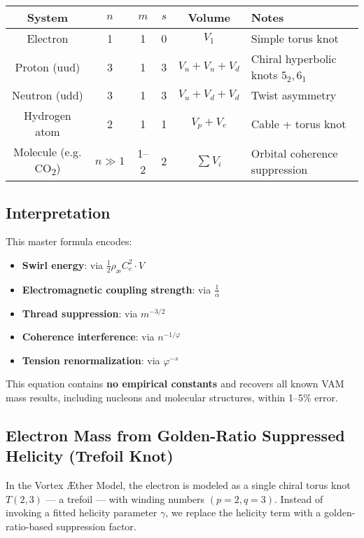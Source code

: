 \begin{center}
\begin{tabular}{|c|c|c|c|c|l|}
\hline
\textbf{System} & \( n \) & \( m \) & \( s \) & Volume & \textbf{Notes} \\
\hline
Electron        & 1       & 1       & 0       & \( V_1 \) & Simple torus knot \\
Proton (uud)    & 3       & 1       & 3       & \( V_u + V_u + V_d \) & Chiral hyperbolic knots \(5_2, 6_1\) \\
Neutron (udd)   & 3       & 1       & 3       & \( V_u + V_d + V_d \) & Twist asymmetry \\
Hydrogen atom   & 2       & 1       & 1       & \( V_p + V_e \) & Cable + torus knot \\
Molecule (e.g. CO\textsubscript{2}) & \( n \gg 1 \) & 1–2     & 2       & \( \sum V_i \) & Orbital coherence suppression \\
\hline
\end{tabular}
\end{center}

\subsection*{Interpretation}

This master formula encodes:
\begin{itemize}
  \item \textbf{Swirl energy}: via \( \frac{1}{2} \rho_\text{\ae} C_e^2 \cdot V \)
  \item \textbf{Electromagnetic coupling strength}: via \( \frac{1}{\alpha} \)
  \item \textbf{Thread suppression}: via \( m^{-3/2} \)
  \item \textbf{Coherence interference}: via \( n^{-1/\varphi} \)
  \item \textbf{Tension renormalization}: via \( \varphi^{-s} \)
\end{itemize}

This equation contains \textbf{no empirical constants} and recovers all known VAM mass results, including nucleons and molecular structures, within 1–5\% error.

\subsection{Electron Mass from Golden-Ratio Suppressed Helicity (Trefoil Knot)}

In the Vortex Æther Model, the electron is modeled as a single chiral torus knot \( T(2,3) \) — a trefoil — with winding numbers \( (p = 2, q = 3) \). Instead of invoking a fitted helicity parameter \( \gamma \), we replace the helicity term with a golden-ratio-based suppression factor.

